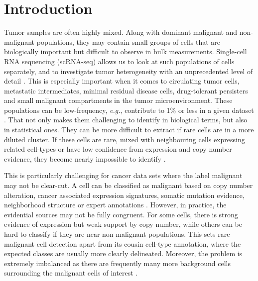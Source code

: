 \documentclass[10pt]{article}
\begin{document}
\section{Introduction}

Tumor samples are often highly mixed. Along with dominant malignant and non-malignant populations, they may contain small groups of cells that are biologically important but difficult to observe in bulk measurements. Single-cell RNA sequencing (scRNA-seq) allows us to look at such populations of cells separately, and to investigate tumor heterogeneity with an unprecedented level of detail \cite{papalexi2018single,tirosh2024cancer}. This is especially important when it comes to circulating tumor cells, metastatic intermediates, minimal residual disease cells, drug-tolerant persisters and small malignant compartments in the tumor microenvironment. These populations can be low-frequency, \textit{e.g.}, contribute to 1\% or less in a given dataset \cite{torre2018rare,gao2021delineating}. That not only makes them challenging to identify in biological terms, but also in statistical ones. They can be more difficult to extract if rare cells are in a more diluted cluster. If these cells are rare, mixed with neighbouring cells expressing related cell-types or have low confidence from expression and copy number evidence, they become nearly impossible to identify \cite{martens2023rarity,stegle2015computational,ren2018understanding}.

This is particularly challenging for cancer data sets where the label malignant may not be clear-cut. A cell can be classified as malignant based on copy number alteration, cancer associated expression signatures, somatic mutation evidence, neighborhood structure or expert annotations \cite{gao2021delineating,gasper2022variant,nofech2023pan}. However, in practice, the evidential sources may not be fully congruent. For some cells, there is strong evidence of expression but weak support by copy number, while others can be hard to classify if they are near non malignant populations. This sets rare malignant cell detection apart from its cousin cell-type annotation, where the expected classes are usually more clearly delineated. Moreover, the problem is extremely imbalanced as there are frequently many more background cells surrounding the malignant cells of interest \cite{johnson2019survey,altalhan2025imbalanced}.
\end{document}
